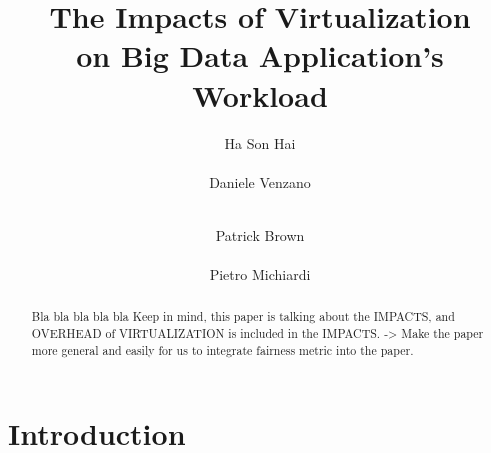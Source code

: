 \documentclass{acmsig}
\begin{document}
\title{The Impacts of Virtualization\\ on Big Data Application's Workload}


\author{
\alignauthor
Ha Son Hai\\
       \\
\alignauthor
Daniele Venzano\\
       \\
\and
\alignauthor
Patrick Brown\\
       \\
\alignauthor
Pietro Michiardi
       \\
}

\maketitle


\begin{abstract}
Bla bla bla bla bla
Keep in mind, this paper is talking about the IMPACTS, and OVERHEAD of VIRTUALIZATION is included in the IMPACTS. -> Make the paper more general and easily for us to integrate fairness metric into the paper.
\end{abstract}

\section{Introduction}
\end{document}
